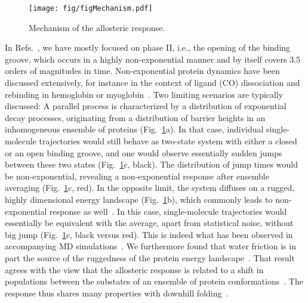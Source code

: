 \documentclass[journal=jacsat,manuscript=article]{achemso}
\begin{document}
\begin{figure}[t]
\centering
\texttt{[image: fig/figMechanism.pdf]}
\caption{Mechanism of the allosteric response.}
\label{figMech}
\end{figure}

In Refs.~\cite{buchli13,waldauer14}, we have mostly focused on phase
II, i.e., the opening of the binding groove, which occurs in a highly
non-exponential manner and by itself covers 3.5 orders of magnitudes
in time. Non-exponential protein dynamics have been discussed
extensively, for instance in the context of ligand (CO) dissociation
and rebinding in hemoglobin or myoglobin~\cite{Frauenfelder91,
  frauenfelder09}. Two limiting scenarios are typically discussed: A
parallel process is characterized by a distribution of exponential
decay processes, originating from a distribution of barrier heights in
an inhomogeneous ensemble of proteins (Fig.~\ref{figMech}a). In that
case, individual single-molecule trajectories would still behave as
two-state system with either a closed or an open binding groove, and
one would observe essentially sudden jumps between these two states
(Fig.~\ref{figMech}c, black). The distribution of jump times would be
non-exponential, revealing a non-exponential response after ensemble
averaging (Fig.~\ref{figMech}c, red). In the opposite limit, the
system diffuses on a rugged, highly dimensional energy landscape
(Fig.~\ref{figMech}b), which commonly leads to non-exponential
response as well~\cite{jaeckle86}. In this case, single-molecule
trajectories would essentially be equivalent with the average, apart
from statistical noise, without big jump (Fig.~\ref{figMech}c, black
versus red). This is indeed what has been observed in accompanying MD
simulations~\cite{buchli13}. We furthermore found that water friction
is in part the source of the ruggedness of the protein energy
landscape~\cite{buchli13,waldauer14}. That result agrees with the view
that the allosteric response is related to a shift in populations
between the substates of an ensemble of protein
conformations~\cite{gunasekaran04, tsai14}. The response thus shares
many properties with downhill folding~\cite{kubelka04,yang03,sadqi06}.
\end{document}
